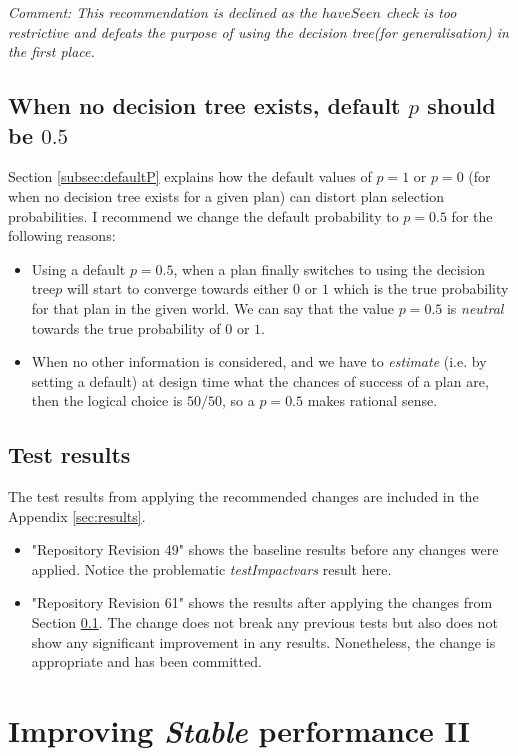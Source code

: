 \documentclass[a4paper]{article}
\newcommand{\tiv}{\emph{testImpactvars}\xspace}
\newcommand{\dt}{{decision tree}\xspace}
\begin{document}
\textit{Comment: This recommendation is declined as the $haveSeen$ check is too restrictive and defeats the purpose of using the \dt (for generalisation) in the first place.}

\subsection{When no \dt exists, default $p$ should be $0.5$}
\label{subsec:use-p-05}

Section \ref{subsec:defaultP} explains how the default values of $p=1$ or $p=0$ (for when no \dt exists for a given plan) can distort plan selection probabilities. I recommend we change the default probability to $p=0.5$ for the following reasons:
\begin{itemize}
\item Using a default $p=0.5$, when a plan finally switches to using the \dt $p$ will start to converge towards either $0$ or $1$ which is the true probability for that plan in the given world. We can say that the value $p=0.5$ is \emph{neutral} towards the true probability of $0$ or $1$.
\item When no other information is considered, and we have to \emph{estimate} (i.e. by setting a default) at design time what the chances of success of a plan are, then the logical choice is $50/50$, so a $p=0.5$ makes rational sense.
\end{itemize}

\subsection{Test results}
The test results from applying the recommended changes are included in the Appendix \ref{sec:results}.
\begin{itemize}
\item "Repository Revision 49" shows the baseline results before any changes were applied. Notice the problematic \tiv result here.
\item "Repository Revision 61" shows the results after applying the changes from Section \ref{subsec:use-p-05}. The change does not break any previous tests but also does not show any significant improvement in any results. Nonetheless, the change is appropriate and has been committed.
\end{itemize}


\section{Improving \textit{Stable} performance II}
\label{sec:stable2}
\end{document}
